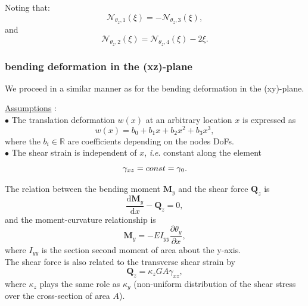 \documentclass[a4paper,11pt]{article}
\newcommand{\R}{\mathbb{R}}
\newcommand{\bM}{\mathbf{M}}
\newcommand{\bQ}{\mathbf{Q}}
\newcommand{\dif}{\mathrm{d}}
\newcommand{\ie}{\textit{i}.\textit{e}. }
\begin{document}
Noting that:
\begin{equation}
	\mathcal{N}_{\theta_z,1}(\xi) = -\mathcal{N}_{\theta_z,3}(\xi),
\end{equation}
and
\begin{equation}
	\mathcal{N}_{\theta_z,2}(\xi) = \mathcal{N}_{\theta_z,4}(\xi) - 2\xi.
\end{equation}



\subsubsection*{bending deformation in the (xz)-plane}

We proceed in a similar manner as for the bending deformation in the (xy)-plane.

\noindent \underline{Assumptions} \cite{Nar74}:\\
$\bullet$ The translation deformation $w(x)$ at an arbitrary location $x$ is
expressed as
\begin{equation} \label{eq:w_expr}
	w(x) = b_0 + b_1x + b_2x^2 + b_3x^3,
\end{equation}
where the $b_i \in \R$ are coefficients depending on the nodes DoFs.\\
$\bullet$ The shear strain is independent of $x$, \ie constant along the element
\begin{equation} \label{eq:gamma_0_bis}
	\gamma_{xz} = const = \gamma_0.\\
\end{equation}

\noindent The relation between the bending moment $\bM_y$ and the shear force
$\bQ_z$ is
\begin{equation} \label{eq:relation_M_y_Q_z}
	\frac{\dif \bM_y}{\dif x} - \bQ_z = 0,
\end{equation}
and the moment-curvature relationship is
\begin{equation} \label{eq:M_y}
	\bM_y = -EI_{yy}\frac{\partial \theta_y}{\partial x},
\end{equation}
where $I_{yy}$ is the section second moment of area about the y-axis.\\
The shear force is also related to the transverse shear strain by
\begin{equation}
	\bQ_z = \kappa_zGA\gamma_{xz},
\end{equation}
where $\kappa_z$ plays the same role as $\kappa_y$ (non-uniform distribution of the
shear stress over the cross-section of area $A$).\\
\end{document}
